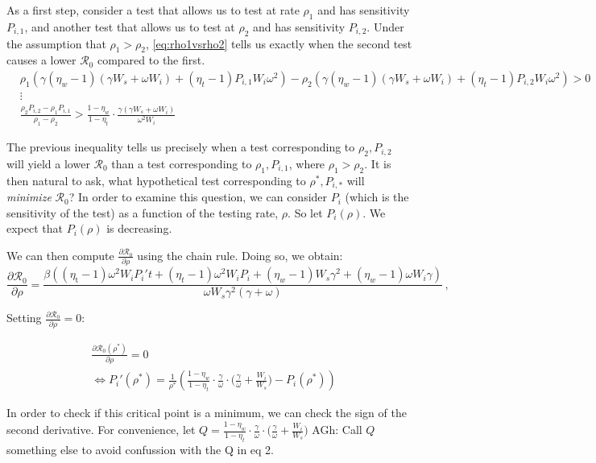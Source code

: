 \documentclass{article}
\newcommand{\Rnum}{\mathcal{R}_0}
\begin{document}
As a first step, consider a test that allows us to test at rate $\rho_1$ and has sensitivity $P_{i,1}$, and another test that allows us to test at $\rho_2$ and has sensitivity $P_{i,2}$. Under the assumption that $\rho_1 > \rho_2$, \cref{eq:rho1vsrho2} tells us exactly when the second test causes a lower $\Rnum$ compared to the first. 
\begin{align}\label{eq:rho1vsrho2}
    &\rho_1\left(\gamma(\eta_w-1)(\gamma W_s + \omega W_i) + (\eta_t-1)P_{i, 1}W_i\omega^2\right) - \rho_2\left(\gamma(\eta_w-1)(\gamma W_s + \omega W_i) + (\eta_t-1)P_{i, 2}W_i\omega^2\right) > 0 \nonumber \\
    &\vdots \nonumber \\
    &\frac{\rho_2P_{i, 2}-\rho_1P_{i, 1} }{\rho_1-\rho_2} > \frac{1-\eta_w}{1-\eta_t}\cdot \frac{\gamma(\gamma W_s + \omega W_i)}{\omega^2 W_i}
\end{align}

The previous inequality tells us precisely when a test corresponding to $\rho_2, P_{i,2}$ will yield a lower $\Rnum$ than a test corresponding to $\rho_1, P_{i,1}$, where $\rho_1 > \rho_2$. It is then natural to ask, what hypothetical test corresponding to $\rho^*, P_{i,*}$ will \textit{minimize} $\Rnum$? In order to examine this question, we can consider $P_i$ (which is the sensitivity of the test) as a function of the testing rate, $\rho$. So let $P_i(\rho)$. We expect that $P_i(\rho)$ is decreasing. 

We can then compute $\frac{\partial \Rnum}{\partial \rho}$ using the chain rule. Doing so, we obtain:
\begin{equation}
\frac{\partial \Rnum}{\partial \rho} = \dfrac{\beta\left(\left(\eta_\text{t}-1\right)\omega^2W_iP_i't+\left(\eta_t-1\right)\omega^2W_iP_i+\left(\eta_w-1\right)W_s\gamma^2+\left(\eta_w-1\right)\omega W_i\gamma\right)}{\omega W_s\gamma^2\left(\gamma+\omega\right)}\,,
\end{equation}

Setting $\frac{\partial \Rnum}{\partial \rho} = 0$:

\begin{align}\label{eq:r0rho=0}
    &\frac{\partial \Rnum(\rho^*)}{\partial \rho} = 0 \nonumber \\
    &\Longleftrightarrow P_i'(\rho^*) = \frac{1}{\rho^*} \left( \frac{1-\eta_w}{1-\eta_t}\cdot\frac{\gamma}{\omega}\cdot\big(\frac{\gamma}{\omega}+\frac{W_i}{W_s}\big) - P_i(\rho^*)\right)
\end{align}

In order to check if this critical point is a minimum, we can check the sign of the second derivative. For convenience, let $Q = \frac{1-\eta_w}{1-\eta_t}\cdot\frac{\gamma}{\omega}\cdot\big(\frac{\gamma}{\omega}+\frac{W_i}{W_s}\big)$ 
AGh: Call $Q$ something else to avoid confussion with the Q in eq 2.
\end{document}
